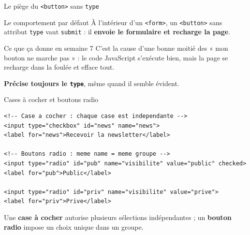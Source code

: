 \documentclass[aspectratio=169,11pt]{beamer}
\begin{document}
\begin{frame}{Le piège du \texttt{<button>} sans \texttt{type}}
  \begin{alertblock}{Le comportement par défaut}
    À l'intérieur d'un \texttt{<form>}, un \texttt{<button>} sans attribut \texttt{type} vaut \texttt{submit} : il \textbf{envoie le formulaire et recharge la page}.
  \end{alertblock}
  \vspace{0.3cm}
  \begin{block}{Ce que ça donne en semaine 7}
    C'est la cause d'une bonne moitié des « mon bouton ne marche pas » : le code JavaScript s'exécute bien, mais la page se recharge dans la foulée et efface tout.
    \vspace{0.15cm}

    \textbf{Précise toujours le \texttt{type}}, même quand il semble évident.
  \end{block}
\end{frame}

\begin{frame}[fragile]{Cases à cocher et boutons radio}
\begin{lstlisting}[language=HTML5]
<!-- Case a cocher : chaque case est independante -->
<input type="checkbox" id="news" name="news">
<label for="news">Recevoir la newsletter</label>

<!-- Boutons radio : meme name = meme groupe -->
<input type="radio" id="pub" name="visibilite" value="public" checked>
<label for="pub">Public</label>

<input type="radio" id="priv" name="visibilite" value="prive">
<label for="priv">Prive</label>
\end{lstlisting}
  \vspace{0.15cm}
  \begin{center}
    \small Une \textbf{case à cocher} autorise plusieurs sélections indépendantes ; un \textbf{bouton radio} impose un choix unique dans un groupe.
  \end{center}
\end{frame}
\end{document}
